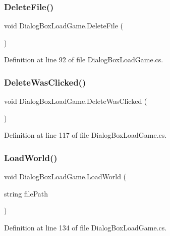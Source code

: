 \subsubsection{\texorpdfstring{Delete\+File()}{DeleteFile()}}
{\footnotesize\ttfamily void Dialog\+Box\+Load\+Game.\+Delete\+File (\begin{DoxyParamCaption}{ }\end{DoxyParamCaption})}



Definition at line 92 of file Dialog\+Box\+Load\+Game.\+cs.

\mbox{\label{class_dialog_box_load_game_a0e76781bf0bde59360af45461f59ae22}} 
\subsubsection{\texorpdfstring{Delete\+Was\+Clicked()}{DeleteWasClicked()}}
{\footnotesize\ttfamily void Dialog\+Box\+Load\+Game.\+Delete\+Was\+Clicked (\begin{DoxyParamCaption}{ }\end{DoxyParamCaption})}



Definition at line 117 of file Dialog\+Box\+Load\+Game.\+cs.

\mbox{\label{class_dialog_box_load_game_a39ab00acf57e549fd6ddaf93dc864ed8}} 
\subsubsection{\texorpdfstring{Load\+World()}{LoadWorld()}}
{\footnotesize\ttfamily void Dialog\+Box\+Load\+Game.\+Load\+World (\begin{DoxyParamCaption}\item[{string}]{file\+Path }\end{DoxyParamCaption})}



Definition at line 134 of file Dialog\+Box\+Load\+Game.\+cs.

\mbox{\label{class_dialog_box_load_game_aaaa212521c2e67fdc685c587fdffe84b}} 

